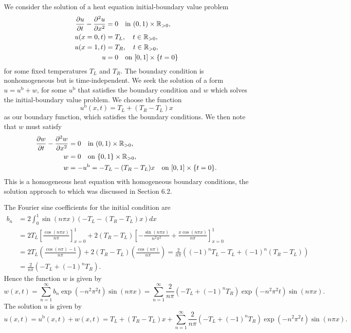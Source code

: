 \begin{example}
    We consider the solution of a heat equation initial-boundary value problem
    \begin{align*}
        \frac{\partial u}{\partial t} - \frac{\partial^2 u}{\partial x^2} &= 0 \quad \text{in } (0, 1) \times \mathbb{R}_{>0}, \\
        u(x = 0, t) &= T_L, \quad t \in \mathbb{R}_{>0}, \\
        u(x = 1, t) &= T_R, \quad t \in \mathbb{R}_{>0}, \\
        u &= 0 \quad \text{on } [0, 1] \times \{t = 0\}
    \end{align*}
    for some fixed temperatures $T_L$ and $T_R$. The boundary condition is nonhomogeneous but is time-independent. We seek the solution of a form $u = u^{\mathrm{b}} + w$, for some $u^{\mathrm{b}}$ that satisfies the boundary condition and $w$ which solves the initial-boundary value problem. We choose the function
    \[u^{\mathrm{b}}(x, t) = T_L + (T_R - T_L) x\]
    as our boundary function, which satisfies the boundary conditions. We then note that $w$ must satisfy
    \begin{align*}
        \frac{\partial w}{\partial t} - \frac{\partial^2 w}{\partial x^2} &= 0 \quad \text{in } (0, 1) \times \mathbb{R}_{>0}, \\
        w &= 0 \quad \text{on } \{0, 1\} \times \mathbb{R}_{>0}, \\
        w &= -u^{\mathrm{b}} = -T_L - (T_R - T_L) x \quad \text{on } [0, 1] \times \{t = 0\}.
    \end{align*}
    This is a homogeneous heat equation with homogeneous boundary conditions, the solution approach to which was discussed in Section 6.2.

    The Fourier sine coefficients for the initial condition are
    \begin{align*}
        b_n &= 2 \int_0^1 \sin(n\pi x)(-T_L - (T_R - T_L) x) dx \\
        &= 2T_L \left[\frac{\cos(n\pi x)}{n\pi}\right]_{x=0}^{1} + 2(T_R - T_L) \left[-\frac{\sin(n\pi x)}{n^2\pi^2} + \frac{x \cos(n\pi x)}{n\pi}\right]_{x=0}^{1} \\
        &= 2T_L \left(\frac{\cos(n\pi) - 1}{n\pi}\right) + 2(T_R - T_L) \left(\frac{\cos(n\pi)}{n\pi}\right) = \frac{2}{n\pi} \left((-1)^n T_L - T_L + (-1)^n (T_R - T_L)\right) \\
        &= \frac{2}{n\pi} (-T_L + (-1)^n T_R).
    \end{align*}
    Hence the function $w$ is given by
    \[w(x, t) = \sum_{n=1}^{\infty} b_n \exp(-n^2\pi^2 t) \sin(n\pi x) = \sum_{n=1}^{\infty} \frac{2}{n\pi} (-T_L + (-1)^n T_R) \exp(-n^2\pi^2 t) \sin(n\pi x).\]
    The solution $u$ is given by
    \[u(x, t) = u^{\mathrm{b}}(x, t) + w(x, t) = T_L + (T_R - T_L) x + \sum_{n=1}^{\infty} \frac{2}{n\pi} (-T_L + (-1)^n T_R) \exp(-n^2\pi^2 t) \sin(n\pi x).\]


\end{example}
